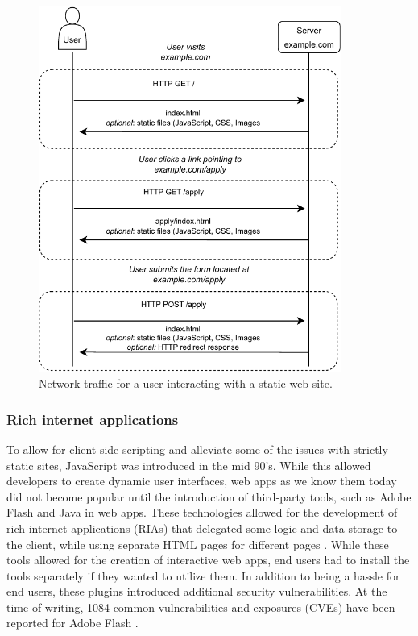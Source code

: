\begin{figure}[b]
	\centering
	\includegraphics[height=120mm]{assets/http_request.drawio.pdf}
	\caption{Network traffic for a user interacting with a static web site.}
	\label{static}
\end{figure}

\subsubsection{Rich internet applications}

To allow for client-side scripting and alleviate some of the issues with strictly static sites, JavaScript was introduced in the mid 90's. While this allowed developers to create dynamic user interfaces, web apps as we know them today did not become popular until the introduction of third-party tools, such as Adobe Flash and Java in web apps. These technologies allowed for the development of rich internet applications (RIAs) that delegated some logic and data storage to the client, while using separate HTML pages for different pages \citep{fraternali_rich_2010}.
While these tools allowed for the creation of interactive web apps, end users had to install the tools separately if they wanted to utilize them. In addition to being a hassle for end users, these plugins introduced additional security vulnerabilities. At the time of writing, 1084 common vulnerabilities and exposures (CVEs) have been reported for Adobe Flash \citep{noauthor_adobe_nodate}.


